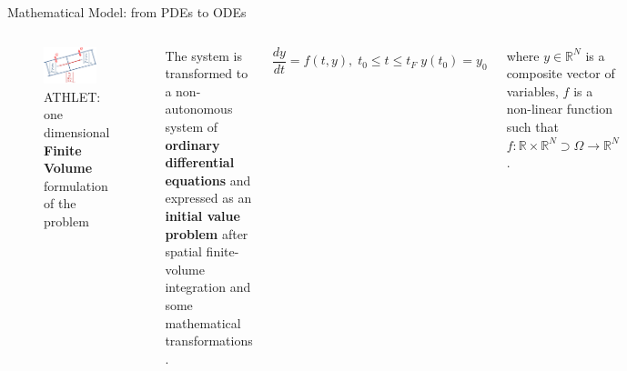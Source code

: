 \begin{frame}[t]{Mathematical Model: from PDEs to ODEs}

    \begin{columns}
            \begin{figure}[htpb]
                \centering
                \includegraphics[width=0.8\textwidth]{figures/introduction-1d-fvm.png}
                \caption{ATHLET: one dimensional \textbf{Finite Volume} formulation of the problem \cite{tims-presentation}}
                \label{fig:introduction-1d-fvm}
            \end{figure}
        
        
        \justifying
        The system is transformed to a non-autonomous system of \textbf{ordinary differential equations} and expressed as an \textbf{initial value problem} after spatial finite-volume integration and some mathematical transformations \cite{lt:ATHLMaM}.
        
        
        \small
        \begin{equation} \label{eq:athlet-8}
	        \frac{dy}{dt} = f(t,y), \;  t_{0} \leq t \leq t_{F} \; y(t_{0}) = y_{0}
        \end{equation}
        \normalsize

        where $y \in \mathbb{R}^{N}$ is a composite vector of variables, $f$ is a non-linear function such that $f : \mathbb{R} \times \mathbb{R}^{N} \supset \Omega  \rightarrow \mathbb{R}^{N}$  .\\

    \end{columns}

\end{frame}

